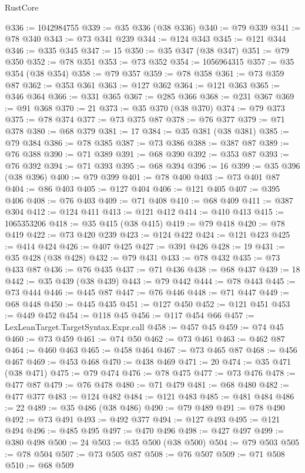 \begin{lexlean}{RustCore}
\begin{coremodule}
@336 := 1042984755
@339 := @35 @336 (@38 @336)
@340 := @79 @339
@341 := @78 @340
@343 := @73 @341 @239
@344 := @124 @343
@345 := @121 @344
@346 := @335 @345
@347 := 15
@350 := @35 @347 (@38 @347)
@351 := @79 @350
@352 := @78 @351
@353 := @73 @352
@354 := 1056964315
@357 := @35 @354 (@38 @354)
@358 := @79 @357
@359 := @78 @358
@361 := @73 @359 @87
@362 := @353 @361
@363 := @127 @362
@364 := @121 @363
@365 := @346 @364
@366 := @331 @365
@367 := @285 @366
@368 := @231 @367
@369 := @91 @368
@370 := 21
@373 := @35 @370 (@38 @370)
@374 := @79 @373
@375 := @78 @374
@377 := @73 @375 @87
@378 := @76 @377
@379 := @71 @378
@380 := @68 @379
@381 := 17
@384 := @35 @381 (@38 @381)
@385 := @79 @384
@386 := @78 @385
@387 := @73 @386
@388 := @387 @87
@389 := @76 @388
@390 := @71 @389
@391 := @68 @390
@392 := @353 @87
@393 := @76 @392
@394 := @71 @393
@395 := @68 @394
@396 := 16
@399 := @35 @396 (@38 @396)
@400 := @79 @399
@401 := @78 @400
@403 := @73 @401 @87
@404 := @86 @403
@405 := @127 @404
@406 := @121 @405
@407 := @395 @406
@408 := @76 @403
@409 := @71 @408
@410 := @68 @409
@411 := @387 @304
@412 := @124 @411
@413 := @121 @412
@414 := @410 @413
@415 := 1065353206
@418 := @35 @415 (@38 @415)
@419 := @79 @418
@420 := @78 @419
@422 := @73 @420 @239
@423 := @124 @422
@424 := @121 @423
@425 := @414 @424
@426 := @407 @425
@427 := @391 @426
@428 := 19
@431 := @35 @428 (@38 @428)
@432 := @79 @431
@433 := @78 @432
@435 := @73 @433 @87
@436 := @76 @435
@437 := @71 @436
@438 := @68 @437
@439 := 18
@442 := @35 @439 (@38 @439)
@443 := @79 @442
@444 := @78 @443
@445 := @73 @444
@446 := @445 @87
@447 := @76 @446
@448 := @71 @447
@449 := @68 @448
@450 := @445 @435
@451 := @127 @450
@452 := @121 @451
@453 := @449 @452
@454 := @118 @45
@456 := @117 @454 @66
@457 := LexLeanTarget.TargetSyntax.Expr.call
@458 := @457 @45
@459 := @74 @45
@460 := @73 @459
@461 := @74 @50
@462 := @73 @461
@463 := @462 @87
@464 := @460 @463
@465 := @458 @464
@467 := @73 @465 @87
@468 := @456 @467
@469 := @453 @468
@470 := @438 @469
@471 := 20
@474 := @35 @471 (@38 @471)
@475 := @79 @474
@476 := @78 @475
@477 := @73 @476
@478 := @477 @87
@479 := @76 @478
@480 := @71 @479
@481 := @68 @480
@482 := @477 @377
@483 := @124 @482
@484 := @121 @483
@485 := @481 @484
@486 := 22
@489 := @35 @486 (@38 @486)
@490 := @79 @489
@491 := @78 @490
@492 := @73 @491
@493 := @492 @377
@494 := @127 @493
@495 := @121 @494
@496 := @485 @495
@497 := @470 @496
@498 := @427 @497
@499 := @380 @498
@500 := 24
@503 := @35 @500 (@38 @500)
@504 := @79 @503
@505 := @78 @504
@507 := @73 @505 @87
@508 := @76 @507
@509 := @71 @508
@510 := @68 @509

\end{coremodule}
\end{lexlean}
